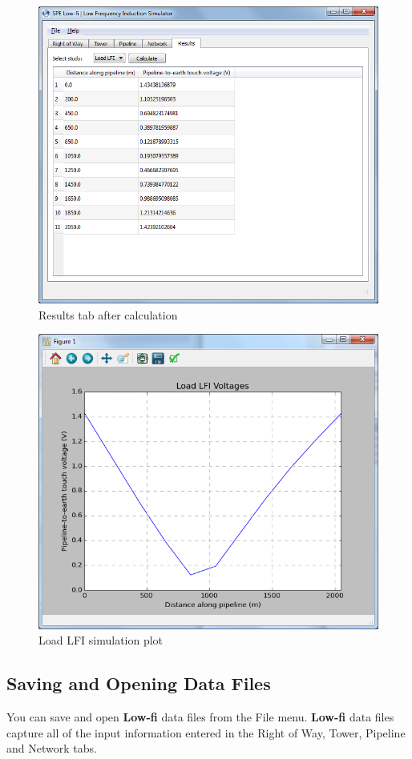 \documentclass{article}
\begin{document}
\begin{figure}[!htpb]
\begin{center}
\caption{Results tab after calculation}
\label{fig:results_after_calc}
\includegraphics[width=0.7\linewidth]{./Figures/load_lfi_results.png}
\end{center}
\end{figure}

\begin{figure}[!htpb]
\begin{center}
\caption{Load LFI simulation plot}
\label{fig:results_plot}
\includegraphics[width=0.7\linewidth]{./Figures/load_lfi_plot.png}
\end{center}
\end{figure}

\newpage
\subsection{Saving and Opening Data Files}
You can save and open \textbf{Low-fi} data files from the File menu. \textbf{Low-fi} data files capture all of the input information entered in the Right of Way, Tower, Pipeline and Network tabs. 
\end{document}
